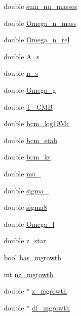 \begin{DoxyCompactItemize}
\item 
double \mbox{\hyperlink{structccl__parameters_aac77d1ee31cd42cd284a582e0cb1db0a}{sum\+\_\+nu\+\_\+masses}}
\item 
double \mbox{\hyperlink{structccl__parameters_af0f1d0f60ab271f9837a71d84bd55c1e}{Omega\+\_\+n\+\_\+mass}}
\item 
double \mbox{\hyperlink{structccl__parameters_ac04eef0f1888df60a0b49dbbc16ee6f3}{Omega\+\_\+n\+\_\+rel}}
\item 
double \mbox{\hyperlink{structccl__parameters_a315b41a853e710ee2cb280f35e65c191}{A\+\_\+s}}
\item 
double \mbox{\hyperlink{structccl__parameters_a976b7ac7ec53a3edfe38e578e183d51d}{n\+\_\+s}}
\item 
double \mbox{\hyperlink{structccl__parameters_a5ab0e3927b1f95e3f3e22fda29e61c31}{Omega\+\_\+g}}
\item 
double \mbox{\hyperlink{structccl__parameters_a3015eb317a0a8fe96512b2c58b7a5965}{T\+\_\+\+C\+MB}}
\item 
double \mbox{\hyperlink{structccl__parameters_a8293dacd3ac0113c081148cf3023c8cc}{bcm\+\_\+log10\+Mc}}
\item 
double \mbox{\hyperlink{structccl__parameters_a145ed3aeb57e69e949c5c8949caa5464}{bcm\+\_\+etab}}
\item 
double \mbox{\hyperlink{structccl__parameters_a7f0aa19c59970b1d51cd14ea5aa9e5c0}{bcm\+\_\+ks}}
\item 
double \mbox{\hyperlink{structccl__parameters_a96b8acaa20e3c1b8994439986697eba3}{mu\+\_}}
\item 
double \mbox{\hyperlink{structccl__parameters_af8ab57a5503219697c9f23ed699226e8}{sigma\+\_}}
\item 
double \mbox{\hyperlink{structccl__parameters_a4d439ea97dad5c5e651fa8943b074fbd}{sigma8}}
\item 
double \mbox{\hyperlink{structccl__parameters_a674308443d7bafd7373e08bad4e274b9}{Omega\+\_\+l}}
\item 
double \mbox{\hyperlink{structccl__parameters_a9d8e2f05bbb7d49baa63171c4fc5ec4d}{z\+\_\+star}}
\item 
bool \mbox{\hyperlink{structccl__parameters_a95772e3679983bd0ad6874b2fcd03eb1}{has\+\_\+mgrowth}}
\item 
int \mbox{\hyperlink{structccl__parameters_a6e52ddfdb58c6823df3cbd1c7b2208e9}{nz\+\_\+mgrowth}}
\item 
double $\ast$ \mbox{\hyperlink{structccl__parameters_a32c039c86113132e1a7c7a1d2a109ba2}{z\+\_\+mgrowth}}
\item 
double $\ast$ \mbox{\hyperlink{structccl__parameters_a1de918f0be839a643cc8283933f1ffe5}{df\+\_\+mgrowth}}
\end{DoxyCompactItemize}


